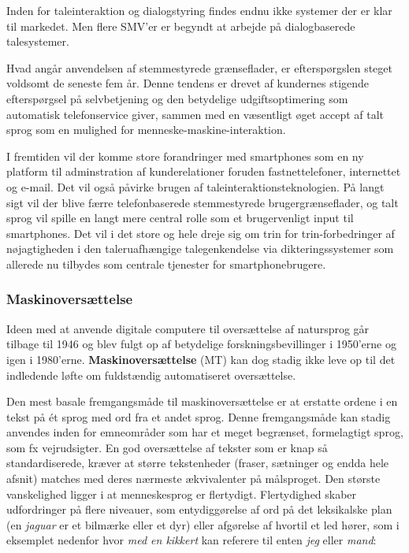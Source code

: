 \documentclass[]{../../metanetpaper}
\begin{document}
\begin{multicols}{2}
Inden for taleinteraktion og dialogstyring findes endnu ikke systemer der er klar til markedet. Men flere SMV'er er begyndt at arbejde \mbox{p\aa} dialogbaserede talesystemer.

Hvad ang\aa r anvendelsen af stemmestyrede gr\ae nseflader, er eftersp\o rgslen steget voldsomt de seneste fem \aa r. Denne tendens er drevet af kundernes stigende eftersp\o rgsel \mbox{p\aa} selvbetjening og den betydelige udgiftsoptimering som automatisk telefonservice giver, sammen med en v\ae sentligt \o get accept af talt sprog som en mulighed for menneske-maskine-interaktion.

I fremtiden vil der komme store forandringer med smartphones som en ny platform til adminstration af kunderelationer foruden fastnettelefoner, internettet og e-mail. Det vil \mbox{ogs\aa} p\aa virke brugen af taleinteraktionsteknologien. \mbox{P\aa} langt sigt vil der blive f\ae rre telefonbaserede stemmestyrede brugergr\ae nseflader, og talt sprog vil spille en langt mere central rolle som et brugervenligt input til smartphones. Det vil i det store og hele dreje sig om trin for trin-forbedringer af n\o jagtigheden i den taleruafh\ae ngige talegenkendelse via dikteringssystemer som allerede nu tilbydes som centrale tjenester for smartphonebrugere.

\subsubsection{Maskinovers\ae ttelse}

Ideen med at anvende digitale computere til overs\ae ttelse af natursprog g\aa r tilbage til 1946 og blev fulgt op af betydelige forskningsbevillinger i 1950'erne og igen i 1980'erne. {\bf Maskinovers\ae ttelse} (MT) kan dog stadig ikke leve op til det indledende l\o fte om fuldst\ae ndig automatiseret overs\ae ttelse.


Den mest basale fremgangsm\aa de til maskinovers\ae ttelse er at erstatte ordene i en tekst \mbox{p\aa} \'{e}t  sprog med ord fra et andet sprog. Denne fremgangsm\aa de kan stadig anvendes inden for emneomr\aa der som har et meget begr\ae nset, formelagtigt sprog, som fx vejrudsigter. En god overs\ae ttelse af tekster som er knap \mbox{s\aa} standardiserede, kr\ae ver at st\o rre tekstenheder (fraser, s\ae tninger og endda hele afsnit) matches med deres n\ae rmeste \ae kvivalenter \mbox{p\aa} m\aa lsproget. Den st\o rste vanskelighed ligger i at menneskesprog er flertydigt. Flertydighed skaber udfordringer \mbox{p\aa} flere niveauer, som entydigg\o relse af ord \mbox{p\aa} det leksikalske plan (en {\it jaguar} er et bilm\ae rke eller et dyr) eller afg\o relse af hvortil et led h\o rer, som i eksemplet nedenfor hvor {\it med en kikkert} kan referere til enten {\it jeg} eller {\it mand}:


\end{multicols}
\end{document}
